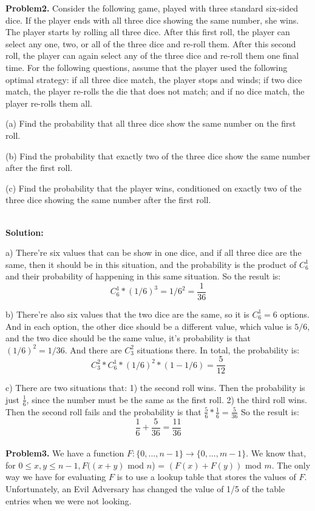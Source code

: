 \documentclass{article}
\begin{document}
\noindent \textbf{Problem2.} Consider the following game, played with three standard six-sided dice. If the player ends
with all three dice showing the same number, she wins. The player starts by rolling all three dice. After
this first roll, the player can select any one, two, or all of the three dice and re-roll them. After this second
roll, the player can again select any of the three dice and re-roll them one final time. For the following
questions, assume that the player used the following optimal strategy: if all three dice match, the player
stops and winds; if two dice match, the player re-rolls the die that does not match; and if no dice match,
the player re-rolls them all.

(a) Find the probability that all three dice show the same number on the first roll.

(b) Find the probability that exactly two of the three dice show the same number after the first roll.

(c) Find the probability that the player wins, conditioned on exactly two of the three dice showing the
same number after the first roll.

~\\

\noindent \textbf{Solution:}

a) There're six values that can be show in one dice, and if all three dice are the same, then it should be in this situation, and the probability is the product of $C_6^1$ and their probability of happening in this same situation. So the result is:
$$ C_6^1 * (1/6)^3 = 1 / 6^2 =  \frac{1}{36} $$

b) There're also six values that the two dice are the same, so it is $C_6^1 = 6$ options. And in each option, the other dice should be a different value, which value is $5/6$, and the two dice should be the same value, it's probability is that $(1/6)^2 = 1/36$. And there are $C_3^2$ situations there. In total, the probability is:
$$ C_3^2 * C_6^1 * (1/6)^2 * (1 - 1/6) = \frac{5}{12} $$

c) There are two situations that:
1) the second roll wins. Then the probability is just $\frac{1}{6}$, since the number must be the same as the first roll.
2) the third roll wins. Then the second roll fails and the probability is that $\frac{5}{6} * \frac{1}{6} = \frac{5}{36}$
So the result is: $$ \frac{1}{6} + \frac{5}{36} = \frac{11}{36}$$
~\\

\noindent \textbf{Problem3.} We have a function $F: \{0,...,n-1\} \rightarrow \{0,...,m-1\}$. We know that, for $0 \le x, y \le n - 1, F((x +y)$ mod $n$) = $(F(x) + F(y))$ mod $m$. The only way we have for evaluating $F$ is to use a lookup table that
stores the values of $F$. Unfortunately, an Evil Adversary has changed the value of 1/5 of the table entries
when we were not looking.
\end{document}
